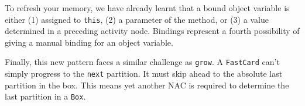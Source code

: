To refresh your memory, we have already learnt that a bound object variable is either (1) assigned to \texttt{this}, (2) a parameter of the method, or (3) a
value determined in a preceding activity node. Bindings represent a fourth possibility of giving a manual binding for an object variable.

Finally, this new pattern faces a similar challenge as \texttt{grow}. A \texttt{FastCard} can't simply progress to the \texttt{next} partition. It must skip
ahead to the absolute last partition in the box. This means yet another NAC is required to determine the last partition in a \texttt{Box}.

  





